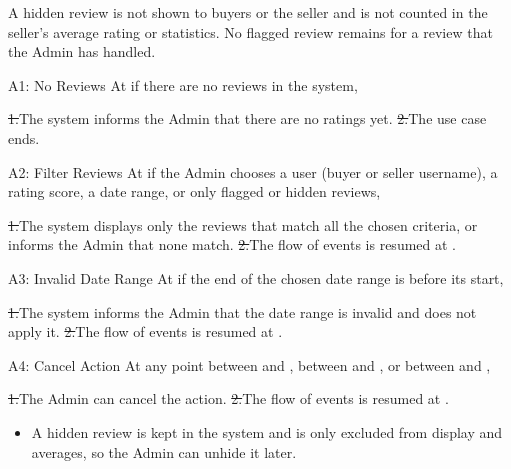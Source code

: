 A hidden review is not shown to buyers or the seller and is not counted in the seller's average rating or statistics. No flagged review remains for a review that the Admin has handled.\par
{}
\begin{flowblock}{A1: No Reviews}
At  if there are no reviews in the system,\par
\st{1.}{The system informs the Admin that there are no ratings yet.}
\st{2.}{The use case ends.}
\end{flowblock}
\begin{flowblock}{A2: Filter Reviews}
At  if the Admin chooses a user (buyer or seller username), a rating score, a date range, or only flagged or hidden reviews,\par
\st{1.}{The system displays only the reviews that match all the chosen criteria, or informs the Admin that none match.}
\st{2.}{The flow of events is resumed at .}
\end{flowblock}
\begin{flowblock}{A3: Invalid Date Range}
At  if the end of the chosen date range is before its start,\par
\st{1.}{The system informs the Admin that the date range is invalid and does not apply it.}
\st{2.}{The flow of events is resumed at .}
\end{flowblock}
\begin{flowblock}{A4: Cancel Action}
At any point between  and , between  and , or between  and ,\par
\st{1.}{The Admin can cancel the action.}
\st{2.}{The flow of events is resumed at .}
\end{flowblock}
\begin{itemize}
  \item A hidden review is kept in the system and is only excluded from display and averages, so the Admin can unhide it later.
\end{itemize}
